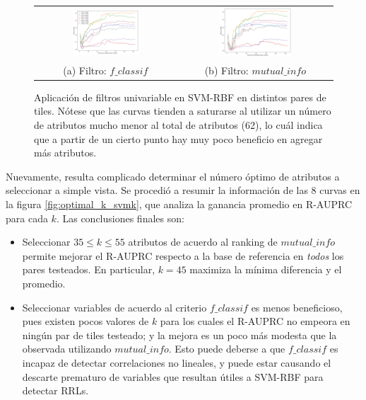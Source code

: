 \begin{figure}[h!]
\begin{tabular}{cc}
  \includegraphics[width=0.49\textwidth]{Kap5/rbf_f_classif_ALL_CURVES.png} &   \includegraphics[width=0.49\textwidth]{Kap5/rbf_mutual_info_classif_ALL_CURVES.png} \\
(a) Filtro: $f\_classif$ & (b) Filtro: $mutual\_info$
\end{tabular}
\caption{Aplicación de filtros univariable en SVM-RBF en distintos pares de tiles.  Nótese que las curvas tienden a saturarse al utilizar un número de atributos mucho menor al total de atributos (62), lo cuál indica que a partir de un cierto punto hay muy poco beneficio en agregar más atributos.}
\label{fig:svmk_univariate_unified}
\end{figure}

Nuevamente, resulta complicado determinar el número óptimo de atributos a seleccionar a simple vista. Se procedió a resumir la información de las 8 curvas en la figura \ref{fig:optimal_k_svmk}, que analiza la ganancia promedio en R-AUPRC para cada $k$. Las conclusiones finales son:

\begin{itemize}
\item Seleccionar $35 \leq k \leq 55$ atributos de acuerdo al ranking de $mutual\_info$ permite mejorar el R-AUPRC respecto a la base de referencia en \textit{todos} los pares testeados. En particular, $k=45$ maximiza la mínima diferencia y el promedio.
\item Seleccionar variables de acuerdo al criterio $f\_classif$ es menos beneficioso, pues existen pocos valores de $k$ para los cuales el R-AUPRC no empeora en ningún par de tiles testeado; y la mejora es un poco más modesta que la observada utilizando $mutual\_info$. Esto puede deberse a que $f\_classif$ es incapaz de detectar correlaciones no lineales, y puede estar causando el descarte prematuro de variables que resultan útiles a SVM-RBF para detectar RRLs.
\end{itemize}

